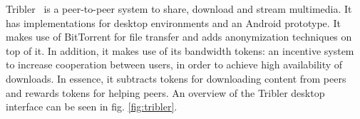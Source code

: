 Tribler~\citep{pouwelse2008tribler} is a peer-to-peer system to share, download and stream multimedia. It has implementations for desktop environments and an Android prototype. It makes use of BitTorrent for file transfer and adds anonymization techniques on top of it. In addition, it makes use of its bandwidth tokens: an incentive system to increase cooperation between users, in order to achieve high availability of downloads. In essence, it subtracts tokens for downloading content from peers and rewards tokens for helping peers. An overview of the Tribler desktop interface can be seen in fig. \ref{fig:tribler}.

